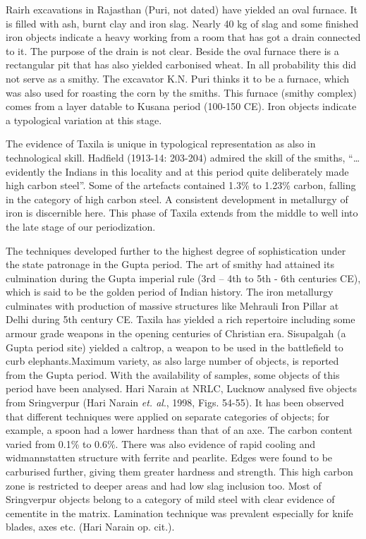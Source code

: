 Rairh excavations in Rajasthan (Puri, not dated) have yielded an oval furnace. It is filled with ash, burnt clay and iron slag. Nearly 40 kg of slag and some finished iron objects indicate a heavy working from a room that has got a drain connected to it. The purpose of the drain is not clear. Beside the oval furnace there is a rectangular pit that has also yielded carbonised wheat. In all probability this did not serve as a smithy. The excavator K.N. Puri thinks it to be a furnace, which was also used for roasting the corn by the smiths. This furnace (smithy complex) comes from a layer datable to Kusana period (100-150 CE). Iron objects indicate a typological variation at this stage.

The evidence of Taxila is unique in typological representation as also in technological skill. Hadfield (1913-14: 203-204) admired the skill of the smiths, “…evidently the Indians in this locality and at this period quite deliberately made high carbon steel”. Some of the artefacts contained 1.3\% to 1.23\% carbon, falling in the category of high carbon steel. A consistent development in metallurgy of iron is discernible here. This phase of Taxila extends from the middle to well into the late stage of our periodization.

The techniques developed further to the highest degree of sophistication under the state patronage in the Gupta period. The art of smithy had attained its culmination during the Gupta imperial rule (3rd – 4th to 5th - 6th centuries CE), which is said to be the golden period of Indian history. The iron metallurgy culminates with production of massive structures like Mehrauli Iron Pillar at Delhi during 5th century CE. Taxila has yielded a rich repertoire including some armour grade weapons in the opening centuries of Christian era. Sisupalgah (a Gupta period site) yielded a caltrop, a weapon to be used in the battlefield to curb elephants.Maximum variety, as also large number of objects, is reported from the Gupta period. With the availability of samples, some objects of this period have been analysed. Hari Narain at NRLC, Lucknow analysed five objects from Sringverpur (Hari Narain \textit{et. al}., 1998, Figs. 54-55). It has been observed that different techniques were applied on separate categories of objects; for example, a spoon had a lower hardness than that of an axe. The carbon content varied from 0.1\% to 0.6\%. There was also evidence of rapid cooling and widmannstatten structure with ferrite and pearlite. Edges were found to be carburised further, giving them greater hardness and strength. This high carbon zone is restricted to deeper areas and had low slag inclusion too. Most of Sringverpur objects belong to a category of mild steel with clear evidence of cementite in the matrix. Lamination technique was prevalent especially for knife blades, axes etc. (Hari Narain op. cit.).

